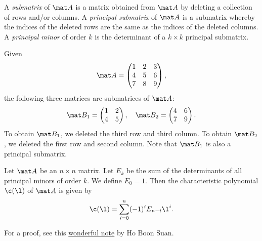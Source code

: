 \begin{definition}
    A \emph{submatrix} of $\mat A$ is a matrix obtained from $\mat A$ by deleting a collection of rows and/or columns. A \emph{principal submatrix} of $\mat A$ is a submatrix whereby the indices of the deleted rows are the same as the indices of the deleted columns. A \emph{principal minor} of order $k$ is the determinant of a $k \times k$ principal submatrix.
\end{definition}

\begin{example}
    Given \[\mat A = \begin{pmatrix}1 & 2 & 3 \\ 4 & 5 & 6 \\ 7 & 8 & 9\end{pmatrix},\] the following three matrices are submatrices of $\mat A$: \[\mat B_1 = \begin{pmatrix}1 & 2 \\ 4 & 5\end{pmatrix}, \quad \mat B_2 = \begin{pmatrix}4 & 6 \\ 7 & 9\end{pmatrix}.\] To obtain $\mat B_1$, we deleted the third row and third column. To obtain $\mat B_2$, we deleted the first row and second column. Note that $\mat B_1$ is also a principal submatrix.
\end{example}

\begin{proposition}
    Let $\mat A$ be an $n \times n$ matrix. Let $E_k$ be the sum of the determinants of all principal minors of order $k$. We define $E_0 = 1$. Then the characteristic polynomial $\c(\l)$ of $\mat A$ is given by \[\c(\l) = \sum_{i = 0}^n (-1)^i E_{n-i} \l^i.\]
\end{proposition}

For a proof, see this \href{https://boonsuan.github.io/misc/cauchy_binet.pdf}{wonderful note} by Ho Boon Suan.

